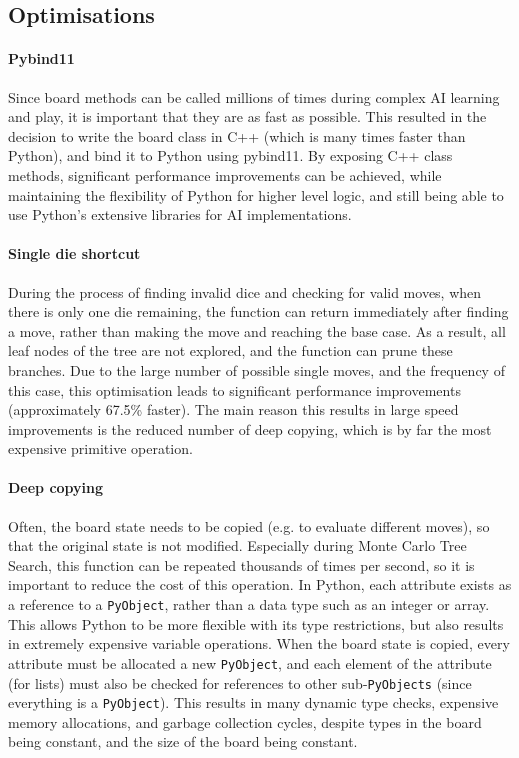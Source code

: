 \subsection{Optimisations}
\paragraph{Pybind11}
Since board methods can be called millions of times during complex AI learning and play, it is important that they are as fast as possible. This resulted in the decision to write the board class in C++ (which is many times faster than Python), and bind it to Python using pybind11. By exposing  C++ class methods, significant performance improvements can be achieved, while maintaining the flexibility of Python for higher level logic, and still being able to use Python's extensive libraries for AI implementations.

\paragraph{Single die shortcut}
During the process of finding invalid dice and checking for valid moves, when there is only one die remaining, the function can return immediately after finding a move, rather than making the move and reaching the base case. As a result, all leaf nodes of the tree are not explored, and the function can prune these branches. Due to the large number of possible single moves, and the frequency of this case, this optimisation leads to significant performance improvements (approximately 67.5\% faster). The main reason this results in large speed improvements is the reduced number of deep copying, which is by far the most expensive primitive operation. 


\paragraph{Deep copying}
Often, the board state needs to be copied (e.g. to evaluate different moves), so that the original state is not modified. Especially during Monte Carlo Tree Search, this function can be repeated thousands of times per second, so it is important to reduce the cost of this operation. In Python, each attribute exists as a reference to a \texttt{PyObject}, rather than a data type such as an integer or array. This allows Python to be more flexible with its type restrictions, but also results in extremely expensive variable operations. When the board state is copied, every attribute must be allocated a new \texttt{PyObject}, and each element of the attribute (for lists) must also be checked for references to other sub-\texttt{PyObjects} (since everything is a \texttt{PyObject}). This results in many dynamic type checks, expensive memory allocations, and garbage collection cycles, despite types in the board being constant, and the size of the board being constant.

